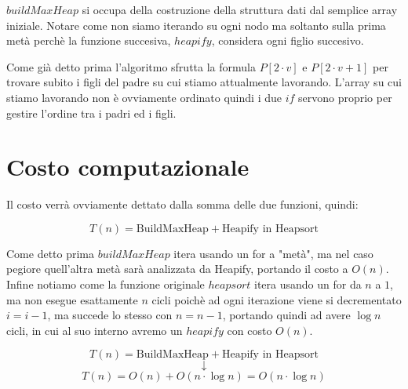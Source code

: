 \documentclass{article}
\begin{document}
$buildMaxHeap$ si occupa della costruzione della struttura dati dal semplice array iniziale. 
Notare come non siamo iterando su ogni nodo ma soltanto sulla prima metà perchè la funzione succesiva,
$heapify$, considera ogni figlio succesivo.

\vspace{0.3cm}
\begin{algorithm}[H]
%

\caption{heapify}
\end{algorithm}
\vspace{0.3cm}

Come già detto prima l'algoritmo sfrutta la formula $P[2 \cdot v]$ e $P[2 \cdot v + 1]$ per trovare
subito i figli del padre su cui stiamo attualmente lavorando. L'array su cui stiamo lavorando
non è ovviamente ordinato quindi i due $if$ servono proprio per gestire l'ordine tra i padri ed 
i figli.

\section*{Costo computazionale}
Il costo verrà ovviamente dettato dalla somma delle due funzioni, quindi:

\[ T(n) = \text{BuildMaxHeap} + \text{Heapify in Heapsort} \]

Come detto prima $buildMaxHeap$ itera usando un for a "metà", ma nel caso pegiore quell'altra
metà sarà analizzata da Heapify, portando il costo a $O(n)$. Infine notiamo come la funzione 
originale $heapsort$ itera usando un for da $n$ a $1$, ma non esegue esattamente $n$ cicli poichè
ad ogni iterazione viene si decrementato $i = i - 1$, ma succede lo stesso con $n = n - 1$, portando
quindi ad avere $\log n$ cicli, in cui al suo interno avremo un $heapify$ con costo $O(n)$.

\[ T(n) = \text{BuildMaxHeap} + \text{Heapify in Heapsort} \]
\[ \downarrow \]
\[ T(n) = O(n) + O(n \cdot \log n) = O(n \cdot \log n)\]
\end{document}
